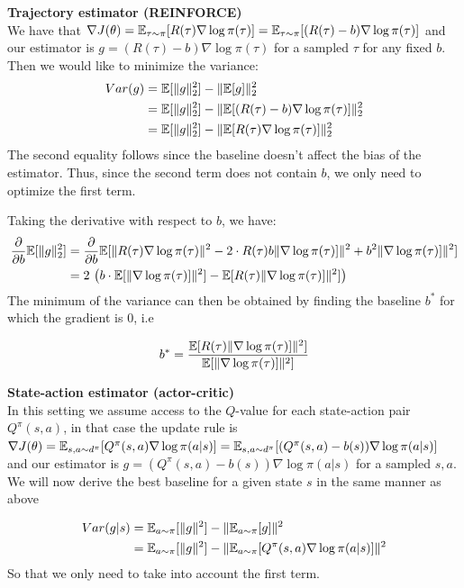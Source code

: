 \textbf{Trajectory estimator (REINFORCE)} \\
We have that $\nabla J(\theta) = \mathbb{E}_{\tau \sim \pi} [R(\tau) \nabla \log \pi(\tau)] = \mathbb{E}_{\tau \sim \pi} [(R(\tau) - b) \nabla \log \pi(\tau)] $ and our estimator is $g = (R(\tau) -b) \nabla \log \pi (\tau)$ for a sampled $\tau$ for any fixed $b$.
Then we would like to minimize the variance: 
\begin{align*}
    Var(g) &= \mathbb{E}[ \|g\|^2_2] - \| \mathbb{E}[g] \|^2_2 \\ 
    &= \mathbb{E}[ \|g\|^2_2] - \| \mathbb{E}[(R(\tau) -b) \nabla \log \pi (\tau)] \|^2_2  \\
    &= \mathbb{E}[ \|g\|^2_2] - \| \mathbb{E}[R(\tau) \nabla \log \pi (\tau)] \|^2_2 
\end{align*}
The second equality follows since the baseline doesn't affect the bias of the estimator.
Thus, since the second term does not contain $b$, we only need to optimize the first term.

Taking the derivative with respect to $b$, we have:
\begin{align*}
    \frac{\partial}{\partial b} \mathbb{E}[ \|g\|^2_2] &= \frac{\partial}{\partial b} \mathbb{E}[ \| R(\tau) \nabla \log \pi (\tau)\|^2 - 2\cdot R(\tau) b \|\nabla \log \pi (\tau)]\|^2 + b^2  \|\nabla \log \pi (\tau)]\|^2]\\
    &= 2\ \big( b \cdot \mathbb{E} [\|\nabla \log \pi (\tau)]\|^2] - \mathbb{E} [ R(\tau) \|  \nabla \log \pi (\tau)]\|^2] \big)\\
\end{align*}
The minimum of the variance can then be obtained by finding the baseline $b^\ast$ for which the gradient is $0$, i.e

$$b^\ast = \frac{ \mathbb{E} [R(\tau) \| \nabla \log \pi (\tau)]\|^2] }{ \mathbb{E} [\| \nabla \log \pi (\tau)]\|^2] }$$


\textbf{State-action estimator (actor-critic)} \\
In this setting we assume access to the $Q$-value for each state-action pair $Q^\pi(s,a)$, in that case the update rule is $\nabla J(\theta) = \mathbb{E}_{s,a \sim d^\pi} [Q^\pi(s,a) \nabla \log \pi(a|s)]  = \mathbb{E}_{s,a \sim d^\pi} [(Q^\pi(s,a) - b(s)) \nabla \log \pi(a|s)] $ and our estimator is $g = (Q^\pi(s,a) - b(s)) \nabla \log \pi(a|s)$ for a sampled $s,a$.
We will now derive the best baseline for a given state $s$ in the same manner as above


\begin{align*}
Var(g | s) &= \mathbb{E}_{a \sim \pi} [\|g\|^2] - \| \mathbb{E}_{a \sim \pi} [g]\|^2\\
 &= \mathbb{E}_{a \sim \pi} [\|g\|^2] - \| \mathbb{E}_{a \sim \pi} [Q^\pi(s,a) \nabla \log \pi(a|s)]\|^2\\
\end{align*}
So that we only need to take into account the first term.

